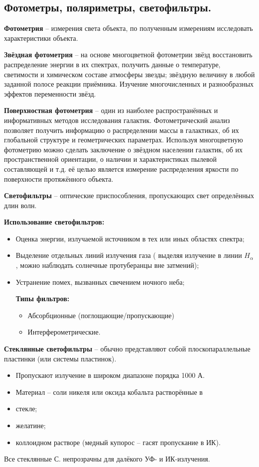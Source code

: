 \documentclass[12pt]{article}
\begin{document}
	
	\subsection{Фотометры, поляриметры, светофильтры.} 
	
	
	\textbf{Фотометрия} -- измерения света объекта, по полученным измерениям исследовать
	характеристики объекта.
	
	\textbf{Звёздная фотометрия} -- на основе многоцветной фотометрии звёзд восстановить
	распределение энергии в их спектрах, получить данные о температуре, светимости и
	химическом составе атмосферы звезды; звёздную величину в любой заданной полосе
	реакции приёмника. Изучение многочисленных и разнообразных эффектов переменности
	звёзд.
	
 	\textbf{Поверхностная фотометрия} -- один из наиболее распространённых и информативных
	методов исследования галактик. Фотометрический анализ позволяет получить
	информацию о распределении массы в галактиках, об их глобальной структуре и
	геометрических параметрах. Используя многоцветную фотометрию можно сделать
	заключение о звёздном населении галактик, об их пространственной ориентации, о наличии
	и характеристиках пылевой составляющей и т.д. её целью является измерение
	распределения яркости по поверхности протяжённого объекта.
	
	\textbf{Светофильтры} -- оптические приспособления, пропускающих свет
	определённых длин волн.
	
	\textbf{Использование светофильтров:}
	\begin{itemize}
		\item Оценка энергии, излучаемой источником в тех или иных областях
		спектра;
		 \item Выделение отдельных линий излучения газа ( выделяя излучение в
		линии $H_{\alpha}$, можно наблюдать солнечные протуберанцы вне затмений);
		\item  Устранение помех, вызванных свечением ночного неба;
		
		\textbf{Типы фильтров:}
		\begin{itemize}
		 \item Абсорбционные (поглощающие/пропускающие)
		\item Интерферометрические.
	\end{itemize}
\end{itemize}


\textbf{Стеклянные светофильтры} -- обычно представляют собой плоскопараллельные пластинки (или
системы пластинок).
\begin{itemize}
\item Пропускают излучение в широком диапазоне порядка 1000 А.
\item Материал – соли никеля или оксида кобальта растворённые в

\item стекле;
\item желатине;
\item коллоидном растворе (медный купорос – гасят пропускание в ИК).
	\end{itemize}
Все стеклянные С. непрозрачны для далёкого УФ- и ИК-излучения.
\end{document}
